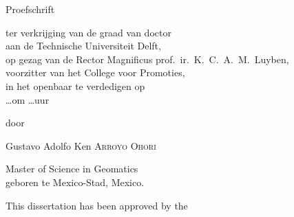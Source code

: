 \begin{titlepage}
\null%
\label{thesis:title}
\vspace{3em}%
\begin{center}

\vspace*{4\baselineskip}

{\makeatletter
\fanciestfont\huge\@title%
\makeatother}
\vfill


{\Large Proefschrift}

\medskip

{ter verkrijging van de graad van doctor \\
aan de Technische Universiteit Delft, \\
op gezag van de Rector Magnificus prof.~ir.~K.~C.~A.~M.~Luyben, \\
voorzitter van het College voor Promoties, \\
in het openbaar te verdedigen op \\
\ldots om \ldots uur}

\medskip

door

\medskip

\makeatletter
{\Large Gustavo Adolfo Ken {\scshape Arroyo Ohori}}
\makeatother

\medskip

Master of Science in Geomatics \\
geboren te Mexico-Stad, Mexico.

\end{center}
\end{titlepage}

\clearpage
\thispagestyle{empty}
\null%
\label{thesis:committee}
\vfill
{}

\noindent This dissertation has been approved by the

